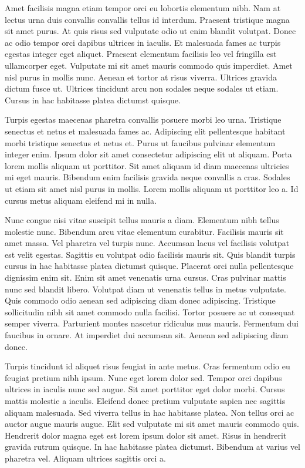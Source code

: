 \documentclass[11pt,a4paper]{article}
\begin{document}
Amet facilisis magna etiam tempor orci eu lobortis elementum nibh. Nam at lectus urna duis convallis convallis tellus id interdum. Praesent tristique magna sit amet purus. At quis risus sed vulputate odio ut enim blandit volutpat. Donec ac odio tempor orci dapibus ultrices in iaculis. Et malesuada fames ac turpis egestas integer eget aliquet. Praesent elementum facilisis leo vel fringilla est ullamcorper eget. Vulputate mi sit amet mauris commodo quis imperdiet. Amet nisl purus in mollis nunc. Aenean et tortor at risus viverra. Ultrices gravida dictum fusce ut. Ultrices tincidunt arcu non sodales neque sodales ut etiam. Cursus in hac habitasse platea dictumst quisque.

Turpis egestas maecenas pharetra convallis posuere morbi leo urna. Tristique senectus et netus et malesuada fames ac. Adipiscing elit pellentesque habitant morbi tristique senectus et netus et. Purus ut faucibus pulvinar elementum integer enim. Ipsum dolor sit amet consectetur adipiscing elit ut aliquam. Porta lorem mollis aliquam ut porttitor. Sit amet aliquam id diam maecenas ultricies mi eget mauris. Bibendum enim facilisis gravida neque convallis a cras. Sodales ut etiam sit amet nisl purus in mollis. Lorem mollis aliquam ut porttitor leo a. Id cursus metus aliquam eleifend mi in nulla.

Nunc congue nisi vitae suscipit tellus mauris a diam. Elementum nibh tellus molestie nunc. Bibendum arcu vitae elementum curabitur. Facilisis mauris sit amet massa. Vel pharetra vel turpis nunc. Accumsan lacus vel facilisis volutpat est velit egestas. Sagittis eu volutpat odio facilisis mauris sit. Quis blandit turpis cursus in hac habitasse platea dictumst quisque. Placerat orci nulla pellentesque dignissim enim sit. Enim sit amet venenatis urna cursus. Cras pulvinar mattis nunc sed blandit libero. Volutpat diam ut venenatis tellus in metus vulputate. Quis commodo odio aenean sed adipiscing diam donec adipiscing. Tristique sollicitudin nibh sit amet commodo nulla facilisi. Tortor posuere ac ut consequat semper viverra. Parturient montes nascetur ridiculus mus mauris. Fermentum dui faucibus in ornare. At imperdiet dui accumsan sit. Aenean sed adipiscing diam donec.

Turpis tincidunt id aliquet risus feugiat in ante metus. Cras fermentum odio eu feugiat pretium nibh ipsum. Nunc eget lorem dolor sed. Tempor orci dapibus ultrices in iaculis nunc sed augue. Sit amet porttitor eget dolor morbi. Cursus mattis molestie a iaculis. Eleifend donec pretium vulputate sapien nec sagittis aliquam malesuada. Sed viverra tellus in hac habitasse platea. Non tellus orci ac auctor augue mauris augue. Elit sed vulputate mi sit amet mauris commodo quis. Hendrerit dolor magna eget est lorem ipsum dolor sit amet. Risus in hendrerit gravida rutrum quisque. In hac habitasse platea dictumst. Bibendum at varius vel pharetra vel. Aliquam ultrices sagittis orci a.
\end{document}
